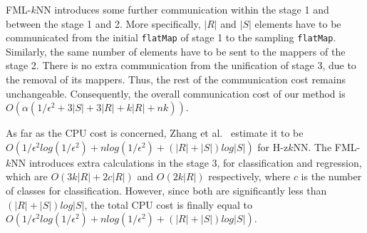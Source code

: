 FML-$k$NN introduces some further communication within the stage 1 and between the stage 1 and 2. More specifically, $|R|$ and $|S|$ elements have to be communicated from the initial \texttt{flatMap} of stage 1 to the sampling \texttt{flatMap}. Similarly, the same number of elements have to be sent to the mappers of the stage 2. There is no extra communication from the unification of stage 3, due to the removal of its mappers. Thus, the rest of the communication cost remains unchangeable. Consequently, the overall communication cost of our method is $O(\alpha(1/\epsilon^2 + 3|S| + 3|R| + k|R| + nk))$.

As far as the CPU cost is concerned, Zhang et al.~\cite{zhang2012epk} estimate it to be $O(1/\epsilon^2 log(1/\epsilon^2) + n log(1/\epsilon^2) + (|R| + |S|)log|S|)$ for H-z$k$NN. The FML-$k$NN introduces extra calculations in the stage 3, for classification and regression, which are $O(3k|R| + 2c|R|)$ and $O(2k|R|)$ respectively, where $c$ is the number of classes for classification. However, since both are significantly less than $(|R| + |S|)log|S|$, the total CPU cost is finally equal to $O(1/\epsilon^2 log(1/\epsilon^2) + n log(1/\epsilon^2) + (|R| + |S|)log|S|)$.